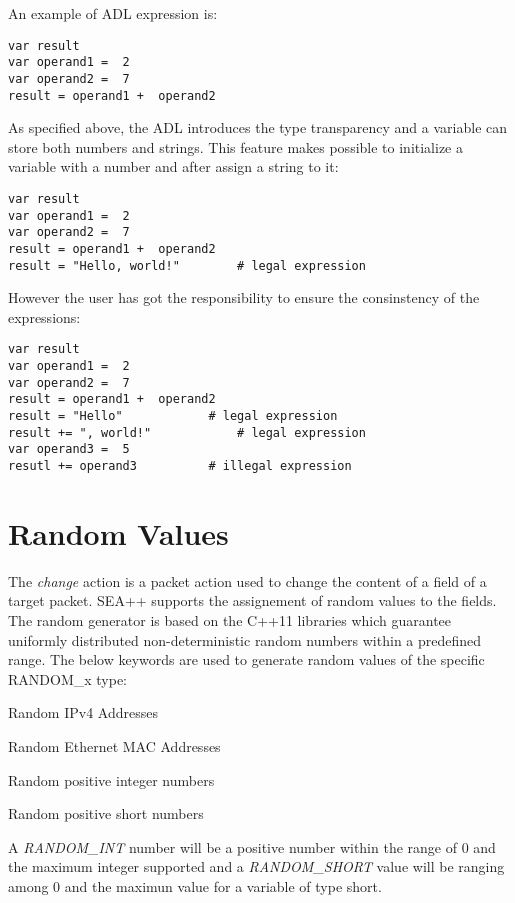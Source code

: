 An example of ADL expression is:
%
\begin{lstlisting}[language={asl}, caption={Syntax expression example}]
var result
var operand1 =  2
var operand2 =  7
result = operand1 +  operand2
\end{lstlisting}
%
As specified above, the ADL introduces the type transparency and a variable can store both numbers and strings. This feature makes possible to initialize a variable with a number and after assign a string to it:
%
\begin{lstlisting}[language={asl}, caption={Legal expressions}]
var result
var operand1 =  2
var operand2 =  7
result = operand1 +  operand2
result = "Hello, world!"		# legal expression
\end{lstlisting}
%
However the user has got the responsibility to ensure the consinstency of the expressions:
%
\begin{lstlisting}[language={asl}, caption={Illegal expressions}]
var result
var operand1 =  2
var operand2 =  7
result = operand1 +  operand2
result = "Hello"			# legal expression
result += ", world!"			# legal expression
var operand3 =  5
resutl += operand3			# illegal expression
\end{lstlisting}

\section{Random Values}
\label{sec:random}
The \emph{change} action is a packet action used to change the content of a field of a target packet. SEA++ supports the assignement of random values to the fields. The random generator is based on the C++11 libraries which guarantee uniformly distributed non-deterministic random numbers within a predefined range. The below keywords are used to generate random values of the specific RANDOM\_x type:
%
\begin{description}
\item { Random IPv4 Addresses}
\item { Random Ethernet MAC Addresses}
\item { Random positive integer numbers}
\item { Random positive short numbers}
\end{description}
%
 A \emph{RANDOM\_INT} number will be a positive number within the range of 0 and the maximum integer supported and a \emph{RANDOM\_SHORT} value will be ranging among 0 and the maximun value for a variable of type short. 

